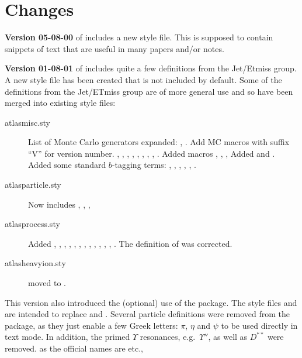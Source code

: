 \onecolumn
\section{Changes}
\label{sec:change}

\textbf{Version 05-08-00} of  includes a new  style file.
This is supposed to contain snippets of text that are useful in many papers and/or notes.

\textbf{Version 01-08-01} of  includes quite a few definitions from the Jet/Etmiss group.
A new style file has been created  that is not included by default.
Some of the definitions from the Jet/ETmiss group are of more general use and so have been merged into existing style files:
\begin{description}
\item[atlasmisc.sty] List of Monte Carlo generators expanded:
  , .
  Add MC macros with suffix \enquote{V} for version number.
  , , , , , , ,
  , .
  Added macros , , ,
  Added  and .
  Added some standard \(b\)-tagging terms:
  , , , , , .
\item[atlasparticle.sty] Now includes , , ,
\item[atlasprocess.sty] Added , ,
  , , , ,
  , ,
  , , ,
  , .
  The definition of  was corrected.
\item[atlasheavyion.sty]  moved to .
\end{description}

This version also introduced the (optional) use of the  package.
The style files  and 
are intended to replace  and .
Several particle definitions were removed from the  package,
as they just enable a few Greek letters: \(\pi\), \(\eta\) and \(\psi\) to be used directly in text mode.
In addition, the primed \(\Upsilon\) resonances, e.g.\ \(\Upsilon''\),
as well as \(D^{**}\) were removed.
as the official names are  etc.,

